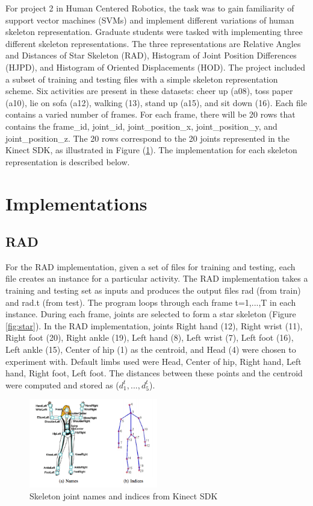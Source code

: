 \documentclass[11pt,nocopyrightspace]{config}
\begin{document}
For project 2 in Human Centered Robotics, the task was to gain familiarity of support vector machines (SVMs) and implement different variations of human skeleton representation. Graduate students were tasked with implementing three different skeleton representations. The three representations are Relative Angles and Distances of Star Skeleton (RAD), Histogram of Joint Position Differences (HJPD), and Histogram of Oriented Displacements (HOD). The project included a subset of training and testing files with a simple skeleton representation scheme. Six activities are present in these datasets: cheer up (a08), toss paper (a10), lie on sofa (a12), walking (13), stand up (a15), and sit down (16). Each file contains a varied number of frames. For each frame, there will be 20 rows that contains the frame\_id, joint\_id, joint\_position\_x, joint\_position\_y, and joint\_position\_z. The 20 rows correspond to the 20 joints represented in the Kinect SDK, as illustrated in Figure (\ref{fig:kinect_sdk}). The implementation for each skeleton representation is described below.

\section{Implementations}
\subsection{RAD}

For the RAD implementation, given a set of files for training and testing, each file creates an instance for a particular activity. The RAD implementation takes a training and testing set as inputs and produces the output files rad (from train) and rad.t (from test). The program loops through each frame t=1,...,T in each instance. During each frame, joints are selected to form a star skeleton (Figure \ref{fig:star}). In the RAD implementation, joints Right hand (12), Right wrist (11), Right foot (20), Right ankle (19), Left hand (8), Left wrist (7), Left foot (16), Left ankle (15), Center of hip (1) as the centroid,  and Head (4) were chosen to experiment with. Default limbs used were Head, Center of hip, Right hand, Left hand, Right foot, Left foot. The distances between these points and the centroid were computed and stored as ($d_1^t,...,d_5^t$). 

\begin{figure}
	\centering
	\includegraphics[width=0.5\textwidth]{skeleton_joint_names_indicies}
	\caption{Skeleton joint names and indices from Kinect SDK}
	\label{fig:kinect_sdk}
\end{figure}
\end{document}
